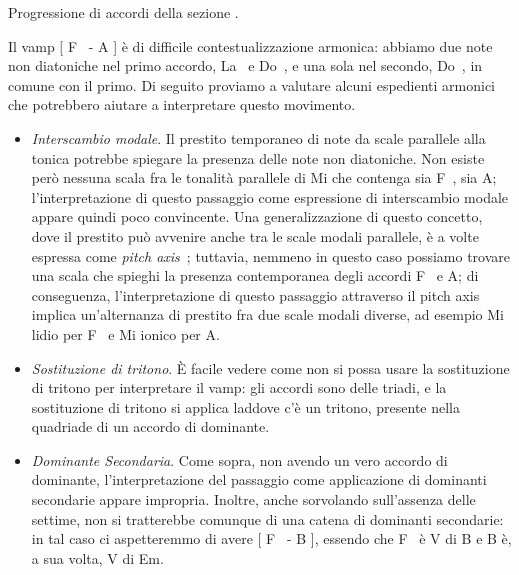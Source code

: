 \documentclass[class=book, crop=false, oneside, 12pt]{standalone}
\begin{document}
    \begin{sheet}[htb]
        \centering
        \caption{Progressione di accordi della sezione .}
        \label{sheet:sheep-b_chords}
    \end{sheet}
    

    Il vamp [ F\sharp~ - A ] è  di difficile contestualizzazione armonica: abbiamo due note non diatoniche nel primo accordo, La\sharp~ e Do\sharp~, e una sola nel secondo, Do\sharp~, in comune con il primo. Di seguito proviamo a valutare alcuni espedienti armonici che potrebbero aiutare a interpretare questo movimento.
    \begin{itemize}
        \item \emph{Interscambio modale}. Il prestito temporaneo di note da scale parallele alla tonica potrebbe spiegare la presenza delle note non diatoniche. Non esiste però nessuna scala fra le tonalità parallele di Mi che contenga sia F\sharp~, sia A; l'interpretazione di questo passaggio come espressione di interscambio modale appare quindi poco convincente. Una generalizzazione di questo concetto, dove il prestito può avvenire anche tra le scale modali parallele, è a volte espressa come \emph{pitch axis}~\cite[9, p. 60]{brachi2008armonia}; tuttavia, nemmeno in questo caso possiamo trovare una scala che spieghi la presenza contemporanea degli accordi F\sharp~ e A; di conseguenza, l'interpretazione di questo passaggio attraverso il pitch axis implica un'alternanza di prestito fra due scale modali diverse, ad esempio Mi lidio per F\sharp~ e Mi ionico per A.
        \item \emph{Sostituzione di tritono}. È facile vedere come non si possa usare la sostituzione di tritono per interpretare il vamp: gli accordi sono delle triadi, e la sostituzione di tritono si applica laddove c'è un tritono, presente nella quadriade di un accordo di dominante.
        \item \emph{Dominante Secondaria}. Come sopra, non avendo un vero accordo di dominante, l'interpretazione del passaggio come applicazione di dominanti secondarie appare impropria. Inoltre, anche sorvolando sull'assenza delle settime, non si tratterebbe comunque di una catena di dominanti secondarie: in tal caso ci aspetteremmo di avere [ F\sharp~ - B ], essendo che F\sharp~ è V di B e B è, a sua volta, V di Em.
    \end{itemize}
    
\end{document}
